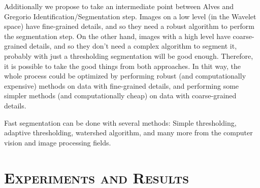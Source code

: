 \documentclass[letter, 11pt]{article}
\begin{document}
Additionally we propose to take an intermediate point between Alves and Gregorio Identification/Segmentation step. Images on a low level (in the Wavelet space) have fine-grained details, and so they need a robust algorithm to perform the segmentation step. On the other hand, images with a high level have coarse-grained details, and so they don't need a complex algorithm to segment it, probably with just a thresholding segmentation will be good enough. Therefore, it is possible to take the good things from both approaches. In thit way, the whole process could be optimized by performing robust (and computationally expensive) methods on data with fine-grained details, and performing some simpler methods (and computationally cheap) on data with coarse-grained details.

Fast segmentation can be done with several methods: Simple thresholding, adaptive thresholding, watershed algorithm, and many more from the computer vision and image processing fields.


\section{\textsc{Experiments and Results}} \label{experiments}
\end{document}
